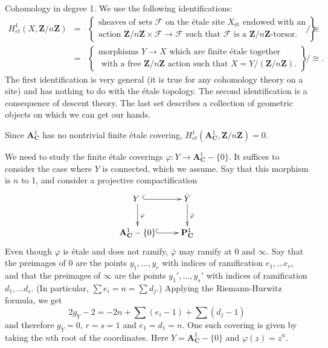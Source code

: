 \medskip\noindent
Cohomology in degree 1. We use the following identifications:
\begin{eqnarray*}
H_{et}^1 (X, \mathbf{Z}/n\mathbf{Z}) & = & \left\{
\begin{array}{c}
\text{sheaves of sets $\mathcal{F}$ on the \'etale site $X_{\text{\'et}}$ 
endowed with an} \\
\text{action $\mathbf{Z}/n\mathbf{Z} \times \mathcal{F} \to \mathcal{F}$ such 
that $\mathcal{F}$ is a $\mathbf{Z}/n\mathbf{Z}$-torsor.}
\end{array}
\right\}
\Big/ \cong 
\\
& = & \left\{
\begin{array}{c}
\text{morphisms $Y \to X$ which are finite \'etale together} \\
\text{ with a free $\mathbf{Z}/n\mathbf{Z}$ action such that $X = Y 
/(\mathbf{Z}/n\mathbf{Z})$.}
\end{array}
\right\}
\Big/ \cong.
\end{eqnarray*}
The first identification is very general (it is true for any cohomology theory 
on a site) and has nothing to do with the \'etale topology. The second 
identification is a consequence of descent theory. The last set describes a 
collection of geometric objects on which we can get our hands.

\medskip\noindent
Since $\mathbf{A}^1_\mathbf{C}$ has no nontrivial finite \'etale covering, 
$H_{et}^1 (\mathbf{A}^1_\mathbf{C}, \mathbf{Z}/n\mathbf{Z}) = 0$.

\medskip\noindent
We need to study the finite \'etale coverings $\varphi: Y \to 
\mathbf{A}^1_\mathbf{C}-\{0\}$. It suffices to consider the case where $Y$ is 
connected, which we assume. Say that this morphism is $n$ to 1, and consider a 
projective compactification
$$
\xymatrix{
{Y\ } \ar@{^{(}->}[r] \ar^{\varphi}[d] & {\bar Y} \ar^{\bar\varphi}[d] \\
{\mathbf{A}^1_\mathbf{C}-\{0\}} \ar@{^{(}->}[r]  &{\mathbf{P}^1_\mathbf{C}}
}
$$
Even though $\varphi$ is \'etale and does not ramify, $\bar{\varphi}$ may 
ramify at 0 and $\infty$. Say that the preimages of 0 are the points $y_1, 
\dots, y_r$ with indices of ramification $e_1, \dots e_r$, and that the 
preimages of $\infty$ are the points $y_1', \dots, y_s'$ with indices of 
ramification $d_1, \dots d_s$. (In particular, $\sum e_i = n = \sum d_j$.) 
Applying the Riemann-Hurwitz formula, we get
$$
2 g_Y - 2 = -2n + \sum (e_i - 1) + \sum (d_j - 1)
$$
and therefore $g_Y = 0$, $r=s=1$ and $e_1 = d_1 = n$. One such covering is 
given by taking the $n$th root of the coordinates. Here $Y = 
{\mathbf{A}^1_\mathbf{C}-\{0\}}$ and $\varphi (z) = z^n$. 

